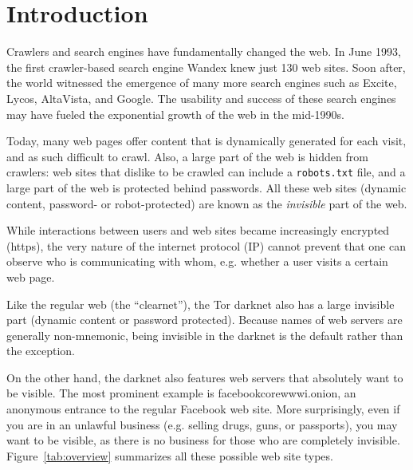 
\section{Introduction}

 
Crawlers and search engines have fundamentally changed the web. In June 1993, the first crawler-based search engine Wandex knew just 130 web sites. Soon after, the world witnessed the emergence of many more search engines such as 
Excite, Lycos, AltaVista, and Google. The usability and success of these search engines may have fueled the exponential growth of the web in the mid-1990s.


Today, many web pages offer content that is dynamically generated for each visit, and as such difficult to crawl. Also, a large part of the web is hidden from crawlers: web sites that dislike to be crawled can include a \texttt{robots.txt} file, and a large part of the web is protected behind passwords. All these web sites (dynamic content, password- or robot-protected) are known as the \emph{invisible} part of the web.


While interactions between users and web sites became increasingly encrypted (https), the very nature of the internet protocol (IP) cannot prevent that one can observe who is communicating with whom, e.g. whether a user visits a certain web page.





Like the regular web (the ``clearnet''), the Tor darknet also has a large invisible part (dynamic content or password protected). Because names of web servers are generally non-mnemonic, being invisible in the darknet is the default rather than the exception.



On the other hand, the darknet also features web servers that absolutely want to be visible. The most prominent example is facebookcorewwwi.onion, an anonymous entrance to the regular Facebook web site. More surprisingly, even if you are in an unlawful business (e.g. selling drugs, guns, or passports), you may want to be visible, as there is no business for those who are completely invisible. Figure~\ref{tab:overview} summarizes all these possible web site types.

